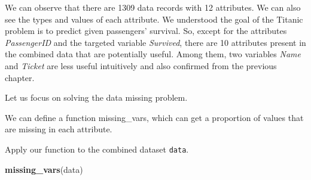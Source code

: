 \documentclass[
]{book}
\newenvironment{Shaded}{\begin{snugshade}}{\end{snugshade}}
\newcommand{\CommentTok}[1]{\textcolor[rgb]{0.56,0.35,0.01}{\textit{#1}}}
\newcommand{\ControlFlowTok}[1]{\textcolor[rgb]{0.13,0.29,0.53}{\textbf{#1}}}
\newcommand{\DataTypeTok}[1]{\textcolor[rgb]{0.13,0.29,0.53}{#1}}
\newcommand{\DecValTok}[1]{\textcolor[rgb]{0.00,0.00,0.81}{#1}}
\newcommand{\KeywordTok}[1]{\textcolor[rgb]{0.13,0.29,0.53}{\textbf{#1}}}
\newcommand{\NormalTok}[1]{#1}
\newcommand{\OperatorTok}[1]{\textcolor[rgb]{0.81,0.36,0.00}{\textbf{#1}}}
\newcommand{\StringTok}[1]{\textcolor[rgb]{0.31,0.60,0.02}{#1}}
\begin{document}
We can observe that there are 1309 data records with 12 attributes. We can also see the types and values of each attribute.
We understood the goal of the Titanic problem is to predict given passengers' survival. So, except for the attributes \emph{PassengerID} and the targeted variable \emph{Survived}, there are 10 attributes present in the combined data that are potentially useful. Among them, two variables \emph{Name} and \emph{Ticket} are less useful intuitively and also confirmed from the previous chapter.

Let us focus on solving the data missing problem.

We can define a function missing\_vars, which can get a proportion of values that are missing in each attribute.

\begin{Shaded}
\end{Shaded}

Apply our function to the combined dataset \texttt{data}.

\begin{Shaded}
\begin{Highlighting}[]
\KeywordTok{missing_vars}\NormalTok{(data)}
\end{Highlighting}
\end{Shaded}
\end{document}
